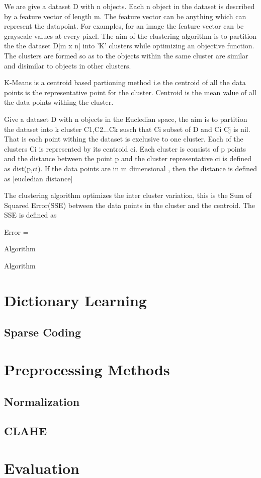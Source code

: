 We are give a dataset D with n objects. Each n object in the dataset is described by a feature vector of length m. The feature vector can be anything which can represent the datapoint. For examples, for an image the feature vector can be grayscale values at every pixel. The aim of the clustering algorithm is to partition the the dataset D[m x n] into 'K' clusters while optimizing an objective function. The clusters are formed so as to the objects within the same cluster are similar and disimilar to objects in other clusters.

K-Means is a centroid based partioning method i.e the centroid of all the data points is the representative point for the cluster. Centroid is the mean value of all the data points withing the cluster.

Give a dataset D with n objects in the Eucledian space, the aim is to partition the dataset into k cluster C1,C2...Ck susch that Ci subset of D and Ci Cj is nil. That is each point withing the dataset is exclusive to one cluster.
Each of the clusters Ci is represented by its centroid ci. Each cluster is consists of p points and the distance between the point p and the cluster representative ci is defined as dist(p,ci). If the data points are in m dimensional , then the distance is defined as
[eucledian distance]

The clustering algorithm optimizes the inter cluster variation, this is the Sum of Squared Error(SSE) between the data points in the cluster and the centroid. 
The SSE  is defined as 

Error = 

Algorithm

Algorithm

\section{Dictionary Learning}

\subsection{Sparse Coding}

\section{Preprocessing Methods}
\subsection{Normalization}
\subsection{CLAHE}

\section{Evaluation}